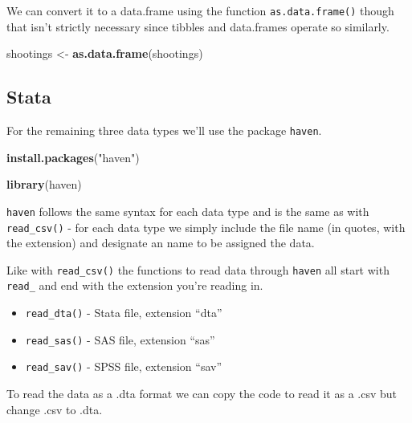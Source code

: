\documentclass[
  12pt,
]{book}
\newenvironment{Shaded}{\begin{snugshade}}{\end{snugshade}}
\newcommand{\KeywordTok}[1]{\textcolor[rgb]{0.13,0.29,0.53}{\textbf{#1}}}
\newcommand{\NormalTok}[1]{#1}
\newcommand{\StringTok}[1]{\textcolor[rgb]{0.31,0.60,0.02}{#1}}
\providecommand{\tightlist}{%
  \setlength{\itemsep}{0pt}\setlength{\parskip}{0pt}}
\begin{document}
We can convert it to a data.frame using the function \texttt{as.data.frame()} though that isn't strictly necessary since tibbles and data.frames operate so similarly.

\begin{Shaded}
\begin{Highlighting}[]
\NormalTok{shootings <{-}}\StringTok{ }\KeywordTok{as.data.frame}\NormalTok{(shootings)}
\end{Highlighting}
\end{Shaded}

\hypertarget{stata}{%
\subsection{Stata}\label{stata}}

For the remaining three data types we'll use the package \texttt{haven}.

\begin{Shaded}
\begin{Highlighting}[]
\KeywordTok{install.packages}\NormalTok{(}\StringTok{"haven"}\NormalTok{)}
\end{Highlighting}
\end{Shaded}

\begin{Shaded}
\begin{Highlighting}[]
\KeywordTok{library}\NormalTok{(haven)}
\end{Highlighting}
\end{Shaded}

\texttt{haven} follows the same syntax for each data type and is the same as with \texttt{read\_csv()} - for each data type we simply include the file name (in quotes, with the extension) and designate an name to be assigned the data.

Like with \texttt{read\_csv()} the functions to read data through \texttt{haven} all start with \texttt{read\_} and end with the extension you're reading in.

\begin{itemize}
\tightlist
\item
  \texttt{read\_dta()} - Stata file, extension ``dta''
\item
  \texttt{read\_sas()} - SAS file, extension ``sas''
\item
  \texttt{read\_sav()} - SPSS file, extension ``sav''
\end{itemize}

To read the data as a .dta format we can copy the code to read it as a .csv but change .csv to .dta.
\end{document}
